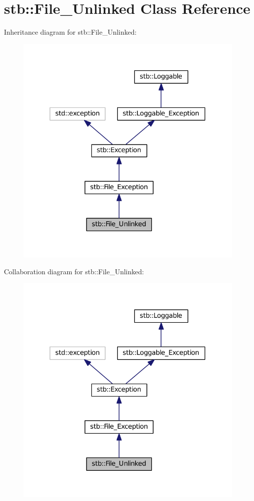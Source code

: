 \hypertarget{classstb_1_1File__Unlinked}{\section{stb\+:\+:File\+\_\+\+Unlinked Class Reference}
\label{classstb_1_1File__Unlinked}
}


Inheritance diagram for stb\+:\+:File\+\_\+\+Unlinked\+:
\nopagebreak
\begin{figure}[H]
\begin{center}
\leavevmode
\includegraphics[width=316pt]{classstb_1_1File__Unlinked__inherit__graph}
\end{center}
\end{figure}


Collaboration diagram for stb\+:\+:File\+\_\+\+Unlinked\+:
\nopagebreak
\begin{figure}[H]
\begin{center}
\leavevmode
\includegraphics[width=316pt]{classstb_1_1File__Unlinked__coll__graph}
\end{center}
\end{figure}
